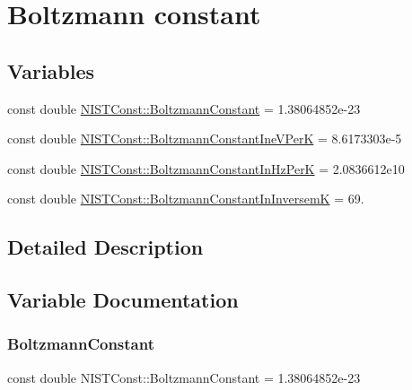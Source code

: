 \hypertarget{group___boltzmann_constant}{}\section{Boltzmann constant}
\label{group___boltzmann_constant}
\subsection*{Variables}
\begin{DoxyCompactItemize}
\item 
const double \hyperlink{group___boltzmann_constant_ga505057a2eb7e925fde668cc1025331df}{N\+I\+S\+T\+Const\+::\+Boltzmann\+Constant} = 1.\+38064852e-\/23
\item 
const double \hyperlink{group___boltzmann_constant_gad31ba56bbe6d4a0f40252ef7b48b52a3}{N\+I\+S\+T\+Const\+::\+Boltzmann\+Constant\+Ine\+V\+PerK} = 8.\+6173303e-\/5
\item 
const double \hyperlink{group___boltzmann_constant_ga5c59003e6fbd70482ee1bdaf7ea35b7a}{N\+I\+S\+T\+Const\+::\+Boltzmann\+Constant\+In\+Hz\+PerK} = 2.\+0836612e10
\item 
const double \hyperlink{group___boltzmann_constant_ga4f4d8adf824657420f54680daa6340d5}{N\+I\+S\+T\+Const\+::\+Boltzmann\+Constant\+In\+InversemK} = 69.
\end{DoxyCompactItemize}


\subsection{Detailed Description}


\subsection{Variable Documentation}
\mbox{\label{group___boltzmann_constant_ga505057a2eb7e925fde668cc1025331df}} 
\subsubsection{\texorpdfstring{Boltzmann\+Constant}{BoltzmannConstant}}
{\footnotesize\ttfamily const double N\+I\+S\+T\+Const\+::\+Boltzmann\+Constant = 1.\+38064852e-\/23}

